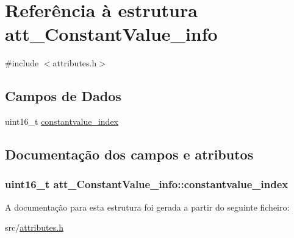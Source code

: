 \hypertarget{structatt__ConstantValue__info}{}\section{Referência à estrutura att\+\_\+\+Constant\+Value\+\_\+info}
\label{structatt__ConstantValue__info}


{\ttfamily \#include $<$attributes.\+h$>$}

\subsection*{Campos de Dados}
\begin{DoxyCompactItemize}
\item 
uint16\+\_\+t \hyperlink{structatt__ConstantValue__info_a6d9c6fc03274f8dc77c2ea8c53744dfa}{constantvalue\+\_\+index}
\end{DoxyCompactItemize}


\subsection{Documentação dos campos e atributos}
\subsubsection[{\texorpdfstring{constantvalue\+\_\+index}{constantvalue_index}}]{\setlength{\rightskip}{0pt plus 5cm}uint16\+\_\+t att\+\_\+\+Constant\+Value\+\_\+info\+::constantvalue\+\_\+index}\hypertarget{structatt__ConstantValue__info_a6d9c6fc03274f8dc77c2ea8c53744dfa}{}\label{structatt__ConstantValue__info_a6d9c6fc03274f8dc77c2ea8c53744dfa}


A documentação para esta estrutura foi gerada a partir do seguinte ficheiro\+:\begin{DoxyCompactItemize}
\item 
src/\hyperlink{attributes_8h}{attributes.\+h}\end{DoxyCompactItemize}
